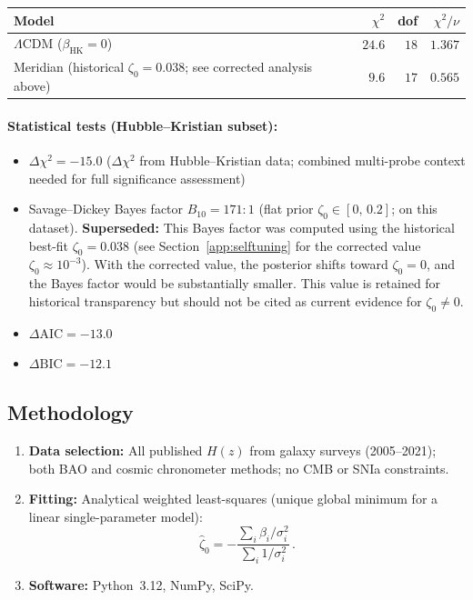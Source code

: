 \begin{center}
\begin{tabular}{l r r r}
\hline
Model & $\chi^2$ & dof & $\chi^2/\nu$ \\
\hline
$\Lambda$CDM ($\beta_{\mathrm{HK}} = 0$) & $24.6$ & $18$ & $1.367$ \\
Meridian (historical $\zeta_0 = 0.038$; see corrected analysis above) & $9.6$ & $17$ & $0.565$ \\
\hline
\end{tabular}
\end{center}

\paragraph{Statistical tests (Hubble--Kristian subset):}
\begin{itemize}
\item $\Delta\chi^2 = -15.0$ ($\Delta\chi^2$ from Hubble--Kristian data; combined multi-probe context needed for full significance assessment)
\item \label{note:bayes-caveat}Savage--Dickey Bayes factor $B_{10} = 171\!:\!1$ (flat prior $\zeta_0 \in [0,\,0.2]$; on this dataset). \textbf{Superseded:} This Bayes factor was computed using the historical best-fit $\zeta_0 = 0.038$ (see Section~\ref{app:selftuning} for the corrected value $\zeta_0 \approx 10^{-3}$). With the corrected value, the posterior shifts toward $\zeta_0 = 0$, and the Bayes factor would be substantially smaller. This value is retained for historical transparency but should not be cited as current evidence for $\zeta_0 \neq 0$.
\item $\Delta\mathrm{AIC} = -13.0$
\item $\Delta\mathrm{BIC} = -12.1$
\end{itemize}

\subsection{Methodology}

\begin{enumerate}
\item \textbf{Data selection:} All published $H(z)$ from galaxy surveys (2005--2021); both BAO and cosmic chronometer methods; no CMB or SNIa constraints.
\item \textbf{Fitting:} Analytical weighted least-squares (unique global minimum for a linear single-parameter model):
\begin{equation}
  \hat{\zeta}_0 = -\frac{\sum_i \beta_i / \sigma_i^2}{\sum_i 1/\sigma_i^2}\,.
\end{equation}
\item \textbf{Software:} Python~3.12, NumPy, SciPy.
\end{enumerate}


